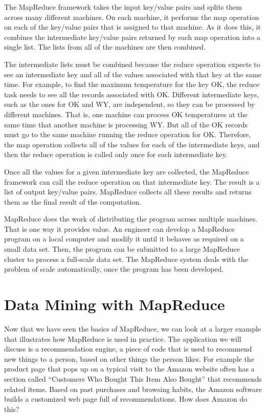 The MapReduce framework
takes the input key/value pairs and splits them across many
different machines.  On each machine, it performs the map
operation on each of the key/value pairs that is assigned to
that machine.  As it does this, it combines the intermediate
key/value pairs returned by each map operation into a single
list.  The lists from all of the machines are then combined.

The intermediate lists must be combined because
the reduce operation expects to see an intermediate key and all
of the values associated with that key at the same time. For example,
to find the maximum temperature for the key \textsf{OK}, the reduce
task needs to see all the records associated with \textsf{OK}.
Different intermediate keys, such as the ones for \textsf{OK} and \textsf{WY},
are independent, so they can be processed by different machines.
That is, one machine can process \textsf{OK} temperatures at the same
time that another machine is processing \textsf{WY}.
But all of the \textsf{OK} records must go to the same machine running
the reduce operation for \textsf{OK}.
Therefore, the map operation collects all of the values for
each of the intermediate keys, and then the reduce operation is
called only once for each intermediate key.

Once all the values for a given intermediate key are
collected, the MapReduce framework can call the reduce
operation on that intermediate key.  The result is a list of
output key/value pairs. MapReduce collects all these
results and returns them as the final result of the computation.

MapReduce does the work of distributing
the program across multiple machines.
That is one way it provides value.
An engineer can develop a MapReduce program on
a local computer and modify it until it behaves as
required on a small data set.
Then, the program can be submitted to a large MapReduce cluster
to process a full-scale data set.
The MapReduce system deals with the problem of scale
automatically, once the program has been developed.

\section{Data Mining with MapReduce}

Now
that we have seen the basics of MapReduce, we can look at
a larger example that illustrates how MapReduce is
used in practice.  The application we will discuss is a recommendation engine,
a piece of code that is used to recommend new things to a person,
based on other things the person likes.
For example the product page that pops up on a typical visit to
the Amazon website often has a section called ``Customers Who Bought
This Item Also Bought'' that recommends related items.
Based on past purchases and browsing habits, the Amazon software
builds a customized web page full of recommendations.
How does Amazon do this?

